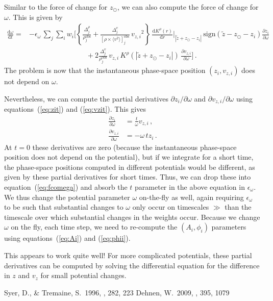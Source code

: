 \documentclass[12pt,preprint]{aastex}
\newcommand{\dd}{\mathrm{d}}
\newcommand{\eqnname}{equation}
\newcommand{\equationname}{\eqnname}
\newcommand{\zsun}{\ensuremath{z_\odot}}
\newcommand{\vz}{\ensuremath{v_z}}
\newcommand{\vzi}{\ensuremath{v_{z,i}}}
\newcommand{\zi}{\ensuremath{z_i}}
\newcommand{\wi}{\ensuremath{w_i}}
\newcommand{\Ai}{\ensuremath{A_i}}
\newcommand{\phii}{\ensuremath{\phi_i}}
\newcommand{\zobs}{\ensuremath{\tilde{z}}}
\newcommand{\eps}{\ensuremath{\epsilon}}
\begin{document}
Similar to the force of change for \zsun, we can also compute the
force of change for $\omega$. This is given by
\begin{equation}\label{eq:fcomega}
\begin{split}
  \frac{\dd \omega}{\dd t} = & -\eps_\omega\,\sum_j \sum_i \wi \Bigg[\left\{\frac{\Delta^\rho_j}{\rho^{\mathrm{obs}}_j}+\frac{\Delta^v_j}{[\rho\times\langle v^2 \rangle]_j^{\mathrm{obs}}}\,\vzi^2\right\}\,\frac{\dd K^\rho(r)}{\dd r}\Bigg|_{|\zobs+\zsun-\zi|}\,\mathrm{sign}(\zobs-\zsun-\zi)\frac{\partial \zi}{\partial \omega}\,\\
  & \qquad \qquad \qquad \qquad +2\frac{\Delta^v_j}{\rho^{\mathrm{obs}}_j} \,\vzi\,K^\rho(|\zobs+\zsun-\zi|)\,\frac{\partial \vzi}{\partial \omega}\Bigg]\,.
\end{split}
\end{equation}
The problem is now that the instantaneous phase-space position
$(\zi,\vzi)$ does not depend on $\omega$.

Nevertheless, we can compute the partial derivatives $\partial \zi /
\partial \omega$ and $\partial \vzi / \partial \omega$ using
\equationname s~(\ref{eq:zit}) and (\ref{eq:vzit}). This gives
\begin{align}
  \frac{\partial \zi}{\partial \omega} & = \frac{t}{\omega} \vzi\,,\\
  \frac{\partial \vzi}{\partial \omega} & = -\omega\,t \zi\,.
\end{align}
At $t=0$ these derivatives are zero (because the instantaneous
phase-space position does not depend on the potential), but if we
integrate for a short time, the phase-space positions computed in
different potentials would be different, as given by these partial
derivatives for short times. Thus, we can drop these into
\equationname~(\ref{eq:fcomega}) and absorb the $t$ parameter in the
above equation in $\eps_\omega$. We thus change the potential
parameter $\omega$ on-the-fly as well, again requiring $\eps_\omega$
to be such that substantial changes to $\omega$ only occur on
timescales $\gg$ than the timescale over which substantial changes in
the weights occur. Because we change $\omega$ on the fly, each time
step, we need to re-compute the $(\Ai,\phii)$ parameters using
\equationname s~(\ref{eq:Ai}) and (\ref{eq:phii}).

This appears to work quite well! For more complicated potentials,
these partial derivatives can be computed by solving the differential
equation for the difference in $z$ and $\vz$ for small potential
changes.



\begin{thebibliography}{}
 Syer, D., \& Tremaine,
  S.\ 1996, \mnras, 282, 223
  Dehnen, W.\ 2009, \mnras, 395, 1079
\end{thebibliography}
\end{document}
